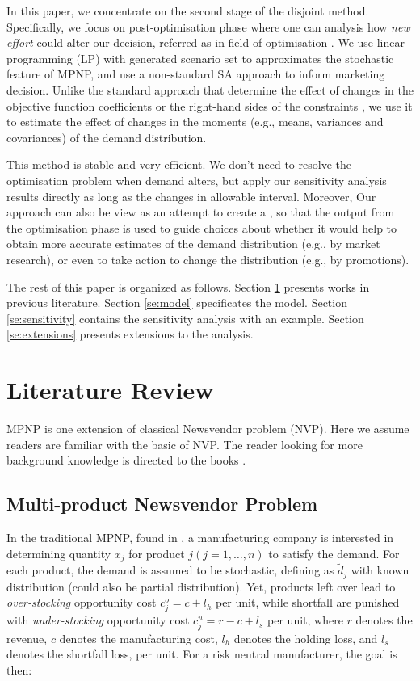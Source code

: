 \documentclass[a4paper,11pt]{article}
\begin{document}
In this paper, we concentrate on the second stage of the disjoint method. Specifically, we focus on post-optimisation phase where one can analysis how \emph{new effort} could alter our decision, referred as  in field of optimisation \cite{D98,Ga03,Va20}. We use linear programming (LP) with generated scenario set to approximates the stochastic feature of MPNP, and use a non-standard SA approach to inform marketing decision. Unlike the standard approach that determine the effect of changes in the objective function coefficients or the right-hand sides of the constraints \cite{DT06}, we use it to estimate the effect of changes in the moments (e.g., means, variances and covariances) of the demand distribution. 

This method is stable and very efficient. We don't need to resolve the optimisation problem when demand alters, but apply our sensitivity analysis results directly as long as the changes in allowable interval. Moreover, Our approach can also be view as an attempt to create a , so that the output from the optimisation phase is used to guide choices about whether it would help to obtain more accurate estimates of the demand distribution (e.g., by market research), or even to take action to change the distribution (e.g., by promotions).

The rest of this paper is organized as follows. Section \ref{se:lit} presents works in previous literature. Section \ref{se:model} specificates the model. Section \ref{se:sensitivity} contains the sensitivity analysis with an example. Section \ref{se:extensions} presents extensions to the analysis.

\section{Literature Review}
\label{se:lit}
MPNP is one extension of classical Newsvendor problem (NVP). Here we assume readers are familiar with the basic of NVP. The reader looking for more background knowledge is directed to the books \cite{Ch12,Po02,SPP98}.

\subsection{Multi-product Newsvendor Problem}
\label{sub:lit_mpnp}
In the traditional MPNP, found in \cite{HW63,NS84}, a manufacturing company is interested in determining quantity $x_j$ for product $j (j=1,\dots,n)$ to satisfy the demand. For each product, the demand is assumed to be stochastic, defining as ${\tilde d}_j$ with known distribution (could also be partial distribution). Yet, products left over lead to \emph{over-stocking} opportunity cost $c_j^o = c + l_h$ per unit, while shortfall are punished with \emph{under-stocking} opportunity cost $c_j^u = r - c + l_s$ per unit, where $r$ denotes the revenue, $c$ denotes the manufacturing cost, $l_h$ denotes the holding loss, and $l_s$ denotes the shortfall loss, per unit. For a risk neutral manufacturer, the goal is then:
\end{document}

